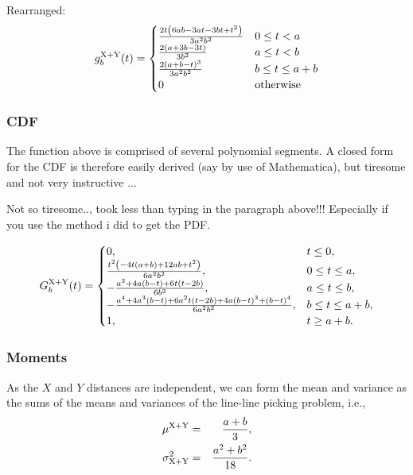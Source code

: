 Rearranged:
\begin{equation}
 g^{\rm X+Y}_b(t) =
 \begin{cases}
 \frac{2 t \left(6 a b-3 a t-3 b t+t^2\right)}{3 a^2 b^2}& 0 \le t < a \\
\frac{2 (a+3 b-3 t)}{3 b^2} & a \le t <  b \\
\frac{2 (a+b-t)^3}{3 a^2 b^2} & b \le t \le  a + b\\
 0 & \mbox{otherwise}
 \end{cases}
\end{equation}

\subsubsection{CDF}

The function above is comprised of several polynomial segments. A
closed form for the CDF is therefore easily derived (say by use of
Mathematica), but tiresome and not very instructive ...

Not so tiresome.., took less than typing in the paragraph above!!!
Especially if you use the method i did to get the PDF.

\begin{equation}
 G^{\rm X+Y}_b(t) =
 \begin{cases}
 0, & t \leq 0, \\
\frac{t^2 \left(-4 t (a+b)+12 a b+t^2\right)}{6 a^2 b^2}, & 0 \leq t \leq a, \\
-\frac{a^2+4 a (b-t)+6 t (t-2 b)}{6 b^2}, & a \leq t \leq  b, \\
-\frac{a^4+4 a^3 (b-t)+6 a^2 t (t-2 b)+4 a (b-t)^3+(b-t)^4}{6 a^2 b^2}, & b \leq t  \leq  a + b,\\
 1, & t \geq a + b.
 \end{cases}
\end{equation}


\subsubsection{Moments}

As the $X$ and $Y$ distances are independent, we can form the mean and
variance as the sums of the means and variances of the line-line
picking problem, i.e.,
\begin{eqnarray}
  \mu^{\rm X+Y} & = & \frac{a+b}{3}, \\
  \label{eq:rect_man_mean}
  \sigma^2_{\rm X+Y}
      & = & \frac{a^{2} + b^2}{18}.
  \label{eq:rect_man_var}
\end{eqnarray}
